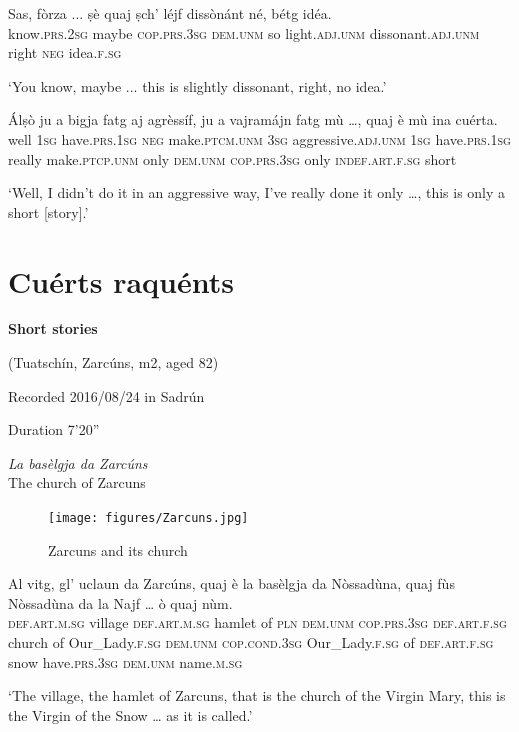 \begin{linenumbers}
\gll  Sas, fòrza ... ṣè quaj ṣch’ léjf dissònánt né, bétg idéa.\\
 know.\textsc{prs.2sg} maybe {} \textsc{cop.prs.3sg} \textsc{dem.unm} so light.\textsc{adj.unm}  dissonant.\textsc{adj.unm} right \textsc{neg} idea.\textsc{f.sg}\\
\end{linenumbers}
\medskip
\glt `You know, maybe ... this is slightly dissonant, right, no idea.'
\medskip

\begin{linenumbers}
\gll  Álṣò ju a bigja fatg aj agrèssíf, ju a vajramájn fatg mù …, quaj è mù ina cuérta.  \\
well \textsc{1sg} have.\textsc{prs.1sg} \textsc{neg} make.\textsc{ptcm.unm} \textsc{3sg} aggressive.\textsc{adj.unm} \textsc{1sg} have.\textsc{prs.1sg} really make.\textsc{ptcp.unm} only {} \textsc{dem.unm} \textsc{cop.prs.3sg} only \textsc{indef.art.f.sg} short \\
\end{linenumbers}
\medskip
\glt `Well, I didn’t do it in an aggressive way, I’ve really done it only …, this is only a short [story].'
\medskip

\section{Cuérts raquénts}
\textbf{Short stories}

\noindent
(Tuatschín, Zarcúns, m2, aged 82)

\noindent
Recorded 2016/08/24 in Sadrún

\noindent
Duration 7'20''

\bigskip

\textit{La basèlgja da Zarcúns}\\
The church of Zarcuns\\
\medskip

\begin{figure}
	\texttt{[image: figures/Zarcuns.jpg]}
	\caption{Zarcuns and its church}
	\end{figure}

\begin{linenumbers}
\gll Al vitg, gl’ uclaun da Zarcúns, quaj è la basèlgja da Nòssadùna, quaj fùs Nòssadùna da la Najf … ò quaj nùm.\\
 \textsc{def.art.m.sg} village \textsc{def.art.m.sg} hamlet of \textsc{pln} \textsc{dem.unm}  \textsc{cop.prs.3sg} \textsc{def.art.f.sg} church of Our\_Lady.\textsc{f.sg} \textsc{dem.unm} \textsc{cop.cond.3sg} Our\_Lady.\textsc{f.sg} of  \textsc{def.art.f.sg} snow {} have.\textsc{prs.3sg} \textsc{dem.unm} name.\textsc{m.sg} \\
\end{linenumbers}
\medskip
\glt `The village, the hamlet of Zarcuns, that is the church of the Virgin Mary, this is the Virgin of the Snow … as it is called.'
\medskip

